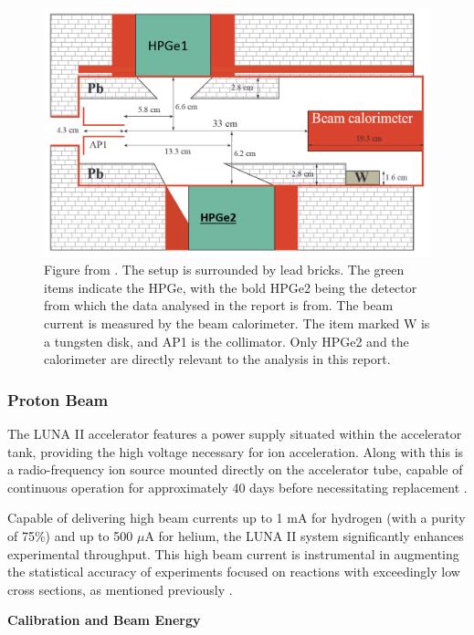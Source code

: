 \documentclass[a4paper,12pt]{article}
\begin{document}
\begin{figure}[h]
    \centering
    \includegraphics{luna_setip.png}
    \caption{Figure from \cite{cavanna2015}.  The setup is surrounded by lead bricks. The green items indicate the HPGe, with the bold HPGe2 being the detector from which the data analysed in the report is from. The beam current is measured by the beam calorimeter.  The item marked W is a tungsten disk, and AP1 is the collimator. Only HPGe2 and the calorimeter are directly relevant to the analysis in this report.}
    \label{fig:luna_setup}
\end{figure}


\subsubsection{Proton Beam}

The LUNA II accelerator features a power supply situated within the accelerator tank, providing the high voltage necessary for ion acceleration. Along with this is a radio-frequency ion source mounted directly on the accelerator tube, capable of continuous operation for approximately 40 days before necessitating replacement \cite{chiara}.

Capable of delivering high beam currents up to 1 mA for hydrogen (with a purity of 75\%) and up to 500 $\mu$A for helium, the LUNA II system significantly enhances experimental throughput. This high beam current is instrumental in augmenting the statistical accuracy of experiments focused on reactions with exceedingly low cross sections, as mentioned previously \cite{chiara}.


\textbf{Calibration and Beam Energy}
\end{document}
